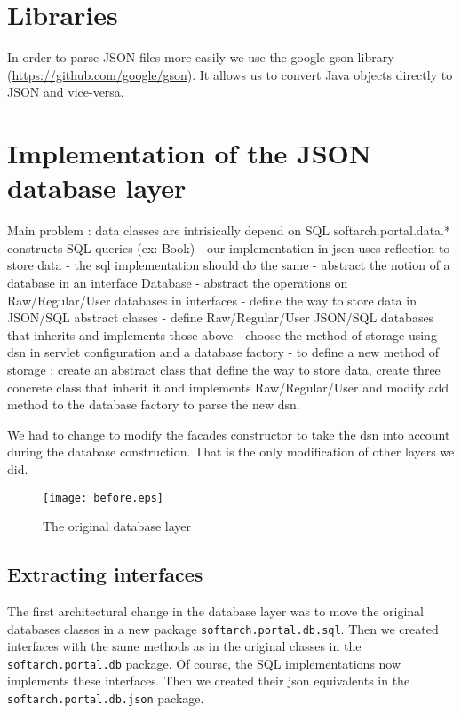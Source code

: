 \section{Libraries}

In order to parse JSON files more easily we use the google-gson library (\href{https://github.com/google/gson}{https://github.com/google/gson}). It allows us to convert Java objects directly to JSON and vice-versa.

\section{Implementation of the JSON database layer}

Main problem : data classes are intrisically depend on SQL softarch.portal.data.* constructs SQL queries (ex: Book) - our implementation in json uses reflection to store data - the sql implementation should do the same - abstract the notion of a database in an interface Database - abstract the operations on Raw/Regular/User databases in interfaces - define the way to store data in JSON/SQL abstract classes - define Raw/Regular/User JSON/SQL databases that inherits and implements those above - choose the method of storage using dsn in servlet configuration and a database factory - to define a new method of storage : create an abstract class that define the way to store data, create three concrete class that inherit it and implements Raw/Regular/User and modify add method to the database factory to parse the new dsn.

We had to change to modify the facades constructor to take the dsn into account during the database construction. That is the only modification of other layers we did.

\begin{figure}[!h]
  \texttt{[image: before.eps]}
  \caption{The original database layer}
\end{figure}

\subsection{Extracting interfaces}
The first architectural change in the database layer was to move the original databases classes in a new package \texttt{softarch.portal.db.sql}. Then we created interfaces with the same methods as in the original classes in the \texttt{softarch.portal.db} package. Of course, the SQL implementations now implements these interfaces. Then we created their json equivalents in the \texttt{softarch.portal.db.json} package.

